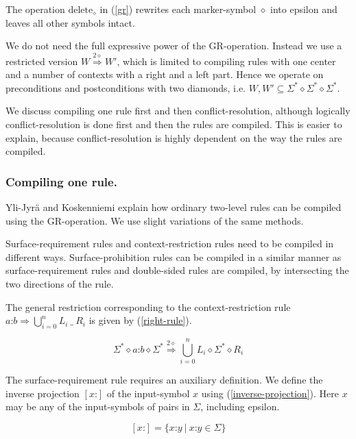 \documentclass[a4paper]{article}
\begin{document}
The operation $\text{delete}_\diamond$ in (\ref{gr}) rewrites each
marker-symbol $\diamond$ into epsilon and leaves all other symbols
intact.

We do not need the full expressive power of the GR-operation. Instead
we use a restricted version $W \overset{2\diamond}{\Rightarrow}W'$,
which is limited to compiling rules with one center and a number of
contexts with a right and a left part. Hence we operate on
preconditions and postconditions with two diamonds,
i.e. $W,W'\subseteq \Sigma^* \diamond \Sigma^* \diamond \Sigma^*$.

We discuss compiling one rule first and then conflict-resolution,
although logically conflict-resolution is done first and then the
rules are compiled. This is easier to explain, because
conflict-resolution is highly dependent on the way the rules are
compiled.

\subsubsection{Compiling one rule.}
\label{twolc-rules}
Yli-Jyr\"a and Koskenniemi \cite{Yli-Jyra06} explain how ordinary
two-level rules can be compiled using the GR-operation. We use slight
variations of the same methods.

Surface-requirement rules and context-restriction rules need to be
compiled in different ways. Surface-prohibition rules can be compiled
in a similar manner as surface-requirement rules and double-sided
rules are compiled, by intersecting the two directions of the rule.

The general restriction corresponding to the context-restriction rule
$a\text{:}b \Rightarrow \bigcup_{i=0}^n L_i\ \_\ R_i$ is given by
(\ref{right-rule}).

\begin{equation}
  \label{right-rule}
  \Sigma^* \diamond a\text{:}b\diamond\Sigma^*
  \overset{2\diamond}{\Rightarrow} \bigcup_{i=0}^n
  L_i\diamond\Sigma^*\diamond R_i
\end{equation}

The surface-requirement rule requires an auxiliary definition. We
define the inverse projection $[x\text{:}]$ of the input-symbol $x$
using (\ref{inverse-projection}). Here $x$ may be any of the
input-symbols of pairs in $\Sigma$, including epsilon.

\begin{equation}
  \label{inverse-projection}
	[x\text{:}] = \{ x\text{:}y\ |\ x\text{:}y \in \Sigma \}
\end{equation}
\end{document}

